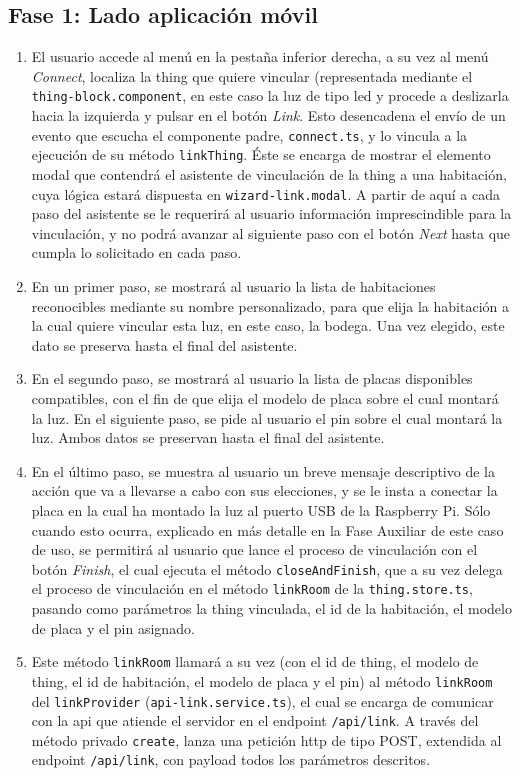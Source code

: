 \subsection{Fase 1: Lado aplicación móvil}
\label{ch:Capitulo5.2.1}
\begin{enumerate}
\item  El usuario accede al menú en la pestaña inferior derecha, a su vez al menú \textit{Connect}, localiza la thing que quiere vincular (representada mediante el \verb|thing-block.component|, en este caso la luz de tipo led y procede a deslizarla hacia la izquierda y pulsar en el botón \textit{Link}. Esto desencadena el envío de un evento que escucha el componente padre, \verb|connect.ts|, y lo vincula a la ejecución de su método \verb|linkThing|. Éste se encarga de mostrar el elemento modal que contendrá el asistente de vinculación de la thing a una habitación, cuya lógica estará dispuesta en \verb|wizard-link.modal|. A partir de aquí a cada paso del asistente se le requerirá al usuario información imprescindible para la vinculación, y no podrá avanzar al siguiente paso con el botón \textit{Next} hasta que cumpla lo solicitado en cada paso.

\item  En un primer paso, se mostrará al usuario la lista de habitaciones reconocibles mediante su nombre personalizado, para que elija la habitación a la cual quiere vincular esta luz, en este caso, la bodega. Una vez elegido, este dato se preserva hasta el final del asistente.

\item En el segundo paso, se mostrará al usuario la lista de placas disponibles compatibles, con el fin de que elija el modelo de placa sobre el cual montará la luz. En el siguiente paso, se pide al usuario el pin sobre el cual montará la luz. Ambos datos se preservan hasta el final del asistente.

\item  En el último paso, se muestra al usuario un breve mensaje descriptivo de la acción que va a llevarse a cabo con sus elecciones, y se le insta a conectar la placa en la cual ha montado la luz al puerto USB de la Raspberry Pi. Sólo cuando esto ocurra, explicado en más detalle en la Fase Auxiliar de este caso de uso, se permitirá al usuario que lance el proceso de vinculación con el botón \textit{Finish}, el cual ejecuta el método \verb|closeAndFinish|, que a su vez delega el proceso de vinculación en el método \verb|linkRoom| de la \verb|thing.store.ts|, pasando como parámetros la thing vinculada, el id de la habitación, el modelo de placa y el pin asignado.

\item  Este método \verb|linkRoom| llamará a su vez (con el id de thing, el modelo de thing, el id de habitación, el modelo de placa y el pin) al método \verb|linkRoom| del \verb|linkProvider| (\verb|api-link.service.ts|), el cual se encarga de comunicar con la api que atiende el servidor en el endpoint \verb|/api/link|. A través del método privado \verb|create|, lanza una petición http de tipo POST, extendida al endpoint \verb|/api/link|, con payload todos los parámetros descritos.
\end{enumerate}

